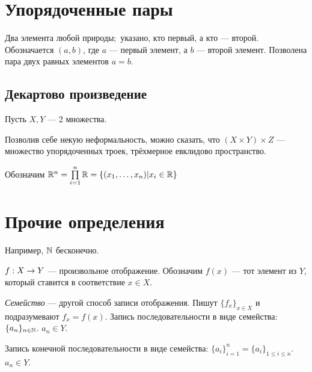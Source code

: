 \documentclass[a4paper]{report}
\begin{document}
    \section{Упорядоченные пары}

    Два элемента любой природы;\ указано, кто первый, а кто --- второй.
    Обозначается $(a, b)$, где $a$ --- первый элемент, а $b$ --- второй элемент.
    Позволена пара двух равных элементов $a = b$.

    \subsection{Декартово произведение}
    Пусть $X, Y$ --- 2 множества.


    Позволив себе некую неформальность, можно сказать, что $(X \times Y) \times Z$ --- множество упорядоченных троек, трёхмерное евклидово пространство.

    Обозначим $\mathbb{R}^n = \prod\limits_{i = 1}^n\mathbb{R} = \{(x_1, \dots, x_n) | x_i \in \mathbb{R}\}$


    \section{Прочие определения}


     Например, $\mathbb{N}$ бесконечно.

    \ok
    $f : X \rightarrow Y$ --- произвольное отображение.
    Обозначим $f(x)$ --- тот элемент из $Y$, который ставится в соответствие $x \in X$.

    \emph{Семейство} --- другой способ записи отображения.
    Пишут $\{f_x\}_{x \in X}$ и подразумевают $f_x = f(x)$.
    \ok
    Запись последовательности в виде семейства: $\{a_n\}_{n \in \mathbb{N}}$. $a_n \in Y$.

     Запись конечной последовательности в виде семейства: $\{a_i\}_{i = 1}^n = \{a_i\}_{1 \le i \le n}$. $a_n \in Y$. 
\end{document}
